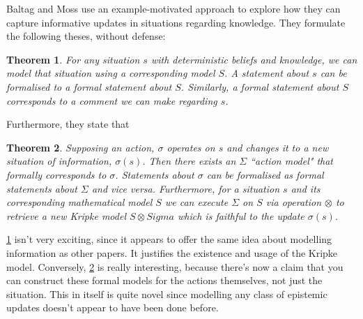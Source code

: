 \documentclass[10pt, a4paper, twoside]{article}
\newtheorem{thm}{Theorem}
\begin{document}
Baltag and Moss use an example-motivated approach to explore how they can
capture informative updates in situations regarding knowledge.
They formulate the following theses, without defense:
\begin{thm}\label{situationModel}
For any situation $s$ with deterministic beliefs and knowledge, we can model
that situation using a corresponding model $S$.
A statement about $s$ can be formalised to a formal statement about $S$.
Similarly, a formal statement about $S$ corresponds to a comment we can make
regarding $s$.
\end{thm}
Furthermore, they state that
\begin{thm}\label{actionModelExists}
Supposing an action, $\sigma$ operates on $s$ and changes it to a new situation
of information, $\sigma(s)$.
Then there exists an $\Sigma$ ``action model" that formally corresponds to
$\sigma$.
Statements about $\sigma$ can be formalised as formal statements about $\Sigma$
and vice versa.
Furthermore, for a situation $s$ and its corresponding mathematical model $S$ we
can execute $\Sigma$ on $S$ via operation $\otimes$ to retrieve a new Kripke
model $S \otimes Sigma$ which is faithful to the update $\sigma(s)$.
\end{thm}
\cref{situationModel} isn't very exciting, since it appears to offer the same
idea about modelling information as other papers.
It justifies the existence and usage of the Kripke model.
Conversely, \cref{actionModelExists} is really interesting, because there's now
a claim that you can construct these formal models for the actions themselves,
not just the situation.
This in itself is quite novel since modelling any class of epistemic updates
doesn't appear to have been done before.\\
\\
\end{document}
